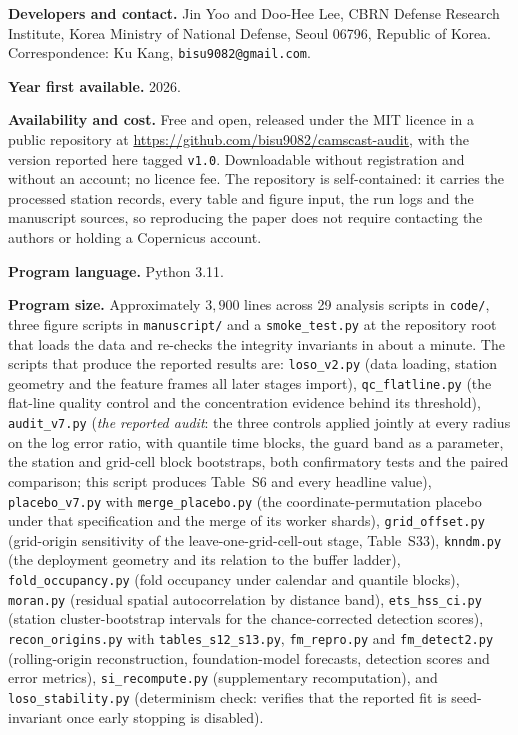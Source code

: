 \documentclass[review,times,authoryear]{elsarticle}
\begin{document}
\noindent\textbf{Developers and contact.} Jin Yoo and Doo-Hee Lee, CBRN Defense Research
Institute, Korea Ministry of National Defense, Seoul 06796, Republic of Korea.
Correspondence: Ku Kang, \texttt{bisu9082@gmail.com}.

\noindent\textbf{Year first available.} 2026.

\noindent\textbf{Availability and cost.} Free and open, released under the MIT licence in
a public repository at \url{https://github.com/bisu9082/camscast-audit}, with the version
reported here tagged \texttt{v1.0}. Downloadable without registration and without an
account; no licence fee. The repository is self-contained: it carries the processed
station records, every table and figure input, the run logs and the manuscript sources,
so reproducing the paper does not require contacting the authors or holding a Copernicus
account.

\noindent\textbf{Program language.} Python 3.11.

\noindent\textbf{Program size.} Approximately $3{,}900$ lines across 29 analysis scripts
in \texttt{code/}, three figure scripts in \texttt{manuscript/} and a \texttt{smoke\_test.py}
at the repository root that loads the data and re-checks the integrity invariants in about
a minute. The scripts that produce the reported results are:
\texttt{loso\_v2.py} (data loading, station geometry and the feature frames all later
stages import), \texttt{qc\_flatline.py} (the flat-line quality control and the
concentration evidence behind its threshold), \texttt{audit\_v7.py} (\emph{the reported
audit}: the three controls applied jointly at every radius on the log error ratio, with
quantile time blocks, the guard band as a parameter, the station and grid-cell block
bootstraps, both confirmatory tests and the paired comparison; this script produces
Table~S6 and every headline value), \texttt{placebo\_v7.py} with
\texttt{merge\_placebo.py} (the coordinate-permutation placebo under that specification
and the merge of its worker shards), \texttt{grid\_offset.py} (grid-origin sensitivity of
the leave-one-grid-cell-out stage, Table~S33), \texttt{knndm.py} (the deployment geometry
and its relation to the buffer ladder), \texttt{fold\_occupancy.py} (fold occupancy under
calendar and quantile blocks), \texttt{moran.py} (residual spatial autocorrelation by
distance band), \texttt{ets\_hss\_ci.py} (station cluster-bootstrap intervals for the
chance-corrected detection scores), \texttt{recon\_origins.py} with
\texttt{tables\_s12\_s13.py}, \texttt{fm\_repro.py} and \texttt{fm\_detect2.py}
(rolling-origin reconstruction, foundation-model forecasts, detection scores and error
metrics), \texttt{si\_recompute.py} (supplementary recomputation), and
\texttt{loso\_stability.py} (determinism check: verifies that the reported fit is
seed-invariant once early stopping is disabled).
\end{document}
